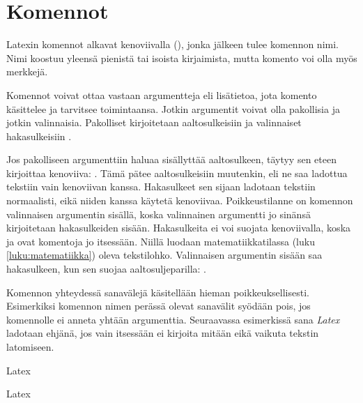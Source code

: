 \section{Komennot}
\label{luku:komennot}

Latexin komennot alkavat kenoviivalla (\koodi{\textbackslash}), jonka
jälkeen tulee komennon nimi. Nimi koostuu yleensä pienistä tai isoista
kirjaimista, mutta komento voi olla myös merkkejä.

Komennot voivat ottaa vastaan argumentteja eli lisätietoa, jota komento
käsittelee ja tarvitsee toimintaansa. Jotkin argumentit voivat olla
pakollisia ja jotkin valinnaisia. Pakolliset kirjoitetaan
aaltosulkeisiin \koodi{\{\ldots\}} ja valinnaiset hakasulkeisiin
\koodi{[\ldots]}.

\begin{koodilohkosis}
  \komento
\end{koodilohkosis}

Jos pakolliseen argumenttiin haluaa sisällyttää aaltosulkeen, täytyy sen
eteen kirjoittaa kenoviiva: . Tämä pätee
aaltosulkeisiin muutenkin, eli ne saa ladottua tekstiin vain kenoviivan
kanssa. Hakasulkeet sen sijaan ladotaan tekstiin normaalisti, eikä
niiden kanssa käytetä kenoviivaa. Poikkeustilanne on komennon
valinnaisen argumentin sisällä, koska valinnainen argumentti jo sinänsä
kirjoitetaan hakasulkeiden sisään. Hakasulkeita ei voi suojata
kenoviivalla, koska \koodi{\keno[} ja \koodi{\keno]} ovat komentoja jo
itsessään. Niillä luodaan matematiikkatilassa (luku
\ref{luku:matematiikka}) oleva tekstilohko. Valinnaisen argumentin
sisään saa hakasulkeen, kun sen suojaa aaltosuljeparilla: \koodi{\keno
  komento[\{]\}]}.

Komennon yhteydessä sanavälejä käsitellään hieman poikkeuksellisesti.
Esimerkiksi komennon nimen perässä olevat sanavälit syödään pois, jos
komennolle ei anneta yhtään argumenttia. Seuraavassa esimerkissä sana
\emph{Latex} ladotaan ehjänä, jos vain 
itsessään ei kirjoita mitään eikä vaikuta tekstin latomiseen.

\pagebreak[3]

\begin{koodilohkosis}
  La\komento   tex
\end{koodilohkosis}

\begin{tulossis}
  Latex
\end{tulossis}

